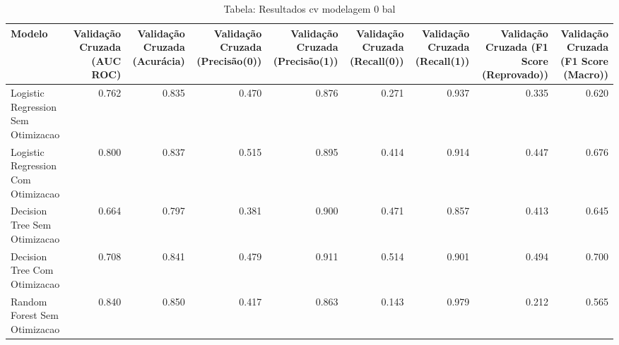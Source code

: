 \begin{table}[H] %
    \centering
    \caption{Tabela: Resultados cv modelagem 0 bal}
    \label{tab:resultados_cv_modelagem_0_bal}
    \renewcommand{\arraystretch}{1.25} %
    \begin{adjustwidth}{ -1in }{ -1in } %
    \centering %
    \small %
    \begin{tabular}{lrrrrrrrr}
\toprule
                            Modelo &  Validação Cruzada (AUC ROC) &  Validação Cruzada (Acurácia) &  Validação Cruzada (Precisão(0)) &  Validação Cruzada (Precisão(1)) &  Validação Cruzada (Recall(0)) &  Validação Cruzada (Recall(1)) &  Validação Cruzada (F1 Score (Reprovado)) &  Validação Cruzada (F1 Score (Macro)) \\
\midrule
Logistic Regression Sem Otimizacao &                        0.762 &                         0.835 &                            0.470 &                            0.876 &                          0.271 &                          0.937 &                                     0.335 &                                 0.620 \\
Logistic Regression Com Otimizacao &                        0.800 &                         0.837 &                            0.515 &                            0.895 &                          0.414 &                          0.914 &                                     0.447 &                                 0.676 \\
      Decision Tree Sem Otimizacao &                        0.664 &                         0.797 &                            0.381 &                            0.900 &                          0.471 &                          0.857 &                                     0.413 &                                 0.645 \\
      Decision Tree Com Otimizacao &                        0.708 &                         0.841 &                            0.479 &                            0.911 &                          0.514 &                          0.901 &                                     0.494 &                                 0.700 \\
      Random Forest Sem Otimizacao &                        0.840 &                         0.850 &                            0.417 &                            0.863 &                          0.143 &                          0.979 &                                     0.212 &                                 0.565 \\

\end{tabular}
\end{adjustwidth}
\end{table}
